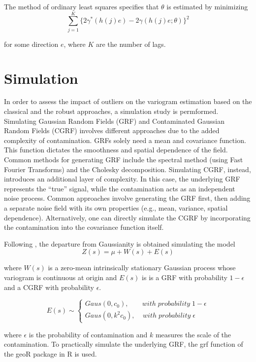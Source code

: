 \documentclass[
  12pt]{article}
\begin{document}
The method of ordinary least squares specifies that \(\theta\) is
estimated by minimizing
\[\sum\limits_{j=1}^K\{2\gamma^{*}(h(j)e)-2\gamma(h(j)e;\theta)\}^2\]

for some direction \(e\), where \(K\) are the number of lags.

\section{Simulation}\label{simulation}

In order to assess the impact of outliers on the variogram estimation
based on the classical and the robust approaches, a simulation study is
permformed. Simulating Gaussian Random Fields (GRF) and Contaminated
Gaussian Random Fields (CGRF) involves different approaches due to the
added complexity of contamination. GRFs solely need a mean and
covariance function. This function dictates the smoothness and spatial
dependence of the field. Common methods for generating GRF include the
spectral method (using Fast Fourier Transforms) and the Cholesky
decomposition. Simulating CGRF, instead, introduces an additional layer
of complexity. In this case, the underlying GRF represents the ``true''
signal, while the contamination acts as an independent noise process.
Common approaches involve generating the GRF first, then adding a
separate noise field with its own properties (e.g., mean, variance,
spatial dependence). Alternatively, one can directly simulate the CGRF
by incorporating the contamination into the covariance function itself.

Following \citet{haw:1984}, the departure from Gaussianity is obtained
simulating the model \[Z(s)=\mu+W(s)+E(s)\]

where \(W(s)\) is a zero-mean intrinsically stationary Gaussian process
whose variogram is continuous at origin and \(E(s)\) is is a GRF with
probability \(1 - \epsilon\) and a CGRF with probability \(\epsilon\).

\[
E(s) \sim
\begin{cases}
  Gaus(0, c_0), \;\;\;\;\;\;\; with \; probability \; 1-\epsilon \\
  Gaus(0, k^2 c_0), \;\;\;\; with \; probability \; \epsilon
\end{cases}
\]

where \(\epsilon\) is the probability of contamination and \(k\)
measures the scale of the contamination. To practically simulate the
underlying GRF, the grf function of the geoR package in R is used.
\end{document}
